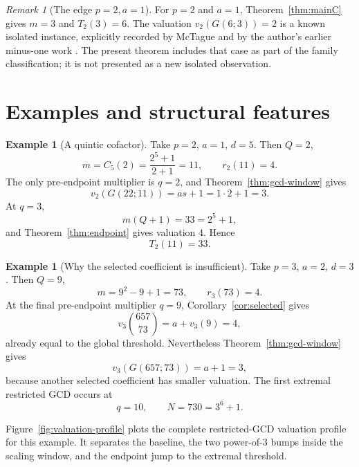 \documentclass[11pt]{article}
\theoremstyle{definition}
\newtheorem{example}[theorem]{Example}
\theoremstyle{remark}
\newtheorem{remark}[theorem]{Remark}
\begin{document}
\begin{remark}[The edge \(p=2,a=1\)]
For \(p=2\) and \(a=1\), Theorem~\ref{thm:mainC} gives \(m=3\) and
\(T_2(3)=6\).  The valuation \(v_2(G(6;3))=2\) is a known isolated instance,
explicitly recorded by McTague \cite{McTague2017} and by the author's earlier
minus-one work \cite{FairfaxBallMinusOne2026}.  The present theorem includes
that case as part of the family classification; it is not presented as a new
isolated observation.
\end{remark}

\section{Examples and structural features}\label{sec:examples}

\begin{example}[A quintic cofactor]
Take \(p=2\), \(a=1\), \(d=5\).  Then \(Q=2\),
\[
  m=C_5(2)=\frac{2^5+1}{2+1}=11,
  \qquad
  r_2(11)=4.
\]
The only pre-endpoint multiplier is \(q=2\), and
Theorem~\ref{thm:gcd-window} gives
\[
  v_2(G(22;11))=as+1=1\cdot2+1=3.
\]
At \(q=3\),
\[
  m(Q+1)=33=2^5+1,
\]
and Theorem~\ref{thm:endpoint} gives valuation \(4\).  Hence
\[
  T_2(11)=33.
\]
\end{example}

\begin{example}[Why the selected coefficient is insufficient]
Take \(p=3\), \(a=2\), \(d=3\).  Then \(Q=9\),
\[
  m=9^2-9+1=73,
  \qquad
  r_3(73)=4.
\]
At the final pre-endpoint multiplier \(q=9\),
Corollary~\ref{cor:selected} gives
\[
  v_3\binom{657}{73}=a+v_3(9)=4,
\]
already equal to the global threshold.  Nevertheless
Theorem~\ref{thm:gcd-window} gives
\[
  v_3(G(657;73))=a+1=3,
\]
because another selected coefficient has smaller valuation.  The first
extremal restricted GCD occurs at
\[
  q=10,\qquad N=730=3^6+1.
\]
\end{example}

Figure~\ref{fig:valuation-profile} plots the complete restricted-GCD valuation
profile for this example.  It separates the baseline, the two power-of-\(3\)
bumps inside the scaling window, and the endpoint jump to the extremal
threshold.
\end{document}
